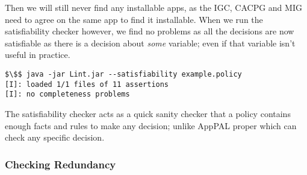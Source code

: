 \documentclass[a4paper]{scrartcl}
\begin{document}
Then we will still never find any installable apps, as the IGC, CACPG and MIG
need to agree on the same app to find it installable.  When we run the
satisfiability checker however, we find no problems as all the decisions are now
satisfiable as there is a decision about \emph{some} variable; even if that
variable isn't useful in practice.

\begin{lstlisting}
$\$$ java -jar Lint.jar --satisfiability example.policy
[I]: loaded 1/1 files of 11 assertions
[I]: no completeness problems
\end{lstlisting}

The satisfiability checker acts as a quick sanity checker that a policy contains
enough facts and rules to make any decision; unlike AppPAL proper which can
check any specific decision.

%

\subsubsection{Checking Redundancy}
\end{document}
